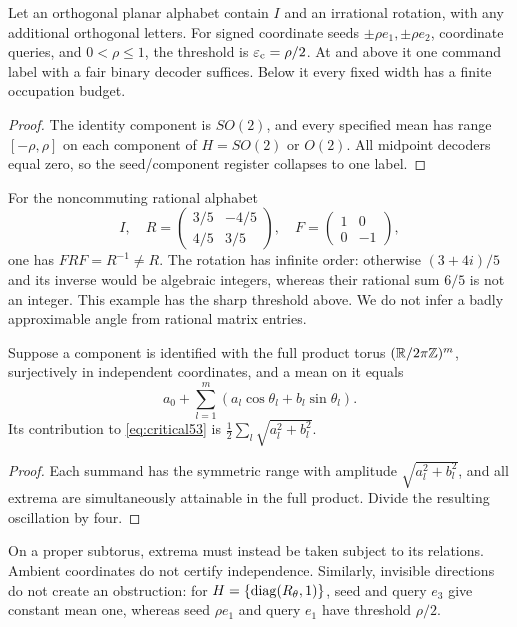 \begin{corollary}\label{cor:circle53}
Let an orthogonal planar alphabet contain $I$ and an irrational rotation, with any additional orthogonal letters. For signed coordinate seeds $\pm\rho e_1,\pm\rho e_2$, coordinate queries, and $0<\rho\le1$, the threshold is $\varepsilon_{\mathrm c}=\rho/2$. At and above it one command label with a fair binary decoder suffices. Below it every fixed width has a finite occupation budget.
\end{corollary}
\begin{proof}
The identity component is $SO(2)$, and every specified mean has range $[-\rho,\rho]$ on each component of $H=SO(2)$ or $O(2)$. All midpoint decoders equal zero, so the seed/component register collapses to one label.
\end{proof}
For the noncommuting rational alphabet
\[
 I,\quad R=\begin{pmatrix}3/5&-4/5\\4/5&3/5\end{pmatrix},\quad
 F=\begin{pmatrix}1&0\\0&-1\end{pmatrix},
\]
one has $FRF=R^{-1}\ne R$. The rotation has infinite order: otherwise $(3+4i)/5$ and its inverse would be algebraic integers, whereas their rational sum $6/5$ is not an integer. This example has the sharp threshold above. We do not infer a badly approximable angle from rational matrix entries.

\begin{proposition}\label{prop:torus53}
Suppose a component is identified with the full product torus $(\mathbb R/2\pi\mathbb Z)^m$, surjectively in independent coordinates, and a mean on it equals
\[
 a_0+\sum_{l=1}^m(a_l\cos\theta_l+b_l\sin\theta_l).
\]
Its contribution to \eqref{eq:critical53} is $\tfrac12\sum_l\sqrt{a_l^2+b_l^2}$.
\end{proposition}
\begin{proof}
Each summand has the symmetric range with amplitude $\sqrt{a_l^2+b_l^2}$, and all extrema are simultaneously attainable in the full product. Divide the resulting oscillation by four.
\end{proof}
On a proper subtorus, extrema must instead be taken subject to its relations. Ambient coordinates do not certify independence. Similarly, invisible directions do not create an obstruction: for $H=\{\operatorname{diag}(R_\theta,1)\}$, seed and query $e_3$ give constant mean one, whereas seed $\rho e_1$ and query $e_1$ have threshold $\rho/2$.

